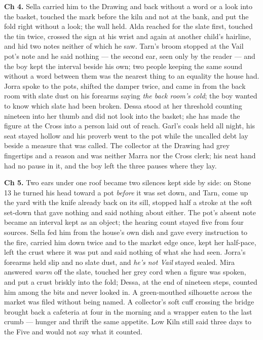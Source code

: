 \documentclass{design/chronicle}
\begin{document}
{\textbf{Ch 4.} Sella carried him to the Drawing and back without a word or a look into the basket, touched the mark before the kiln and not at the bank, and put the fold right without a look; the wall held. Alda reached for the slate first, touched the tin twice, crossed the sign at his wrist and again at another child’s hairline, and hid two notes neither of which he saw. Tarn’s broom stopped at the Vail pot’s note and he said nothing --- the second ear, seen only by the reader --- and the boy kept the interval beside his own; two people keeping the same sound without a word between them was the nearest thing to an equality the house had. Jorra spoke to the pots, shifted the damper twice, and came in from the back room with slate dust on his forearms saying \emph{the back room’s cold}; the boy wanted to know which slate had been broken. Dessa stood at her threshold counting nineteen into her thumb and did not look into the basket; she has made the figure at the Cross into a person laid out of reach. Garl’s coals held all night, his seat stayed hollow and his proverb went to the pot while the uncalled debt lay beside a measure that was called. The collector at the Drawing had grey fingertips and a reason and was neither Marra nor the Cross clerk; his neat hand had no pause in it, and the boy left the three pauses where they lay.

\textbf{Ch 5.} Two ears under one roof became two silences kept side by side: on Stone 13 he turned his head toward a pot \emph{before} it was set down, and Tarn, come up the yard with the knife already back on its sill, stopped half a stroke at the soft set-down that gave nothing and said nothing about either. The pot’s absent note became an interval kept as an object; the hearing count stayed five from four sources. Sella fed him from the house’s own dish and gave every instruction to the fire, carried him down twice and to the market edge once, kept her half-pace, left the crust where it was put and said nothing of what she had seen. Jorra’s forearms held slip and no slate dust, and \emph{he’s not Vail} stayed sealed. Mira answered \emph{warm} off the slate, touched her grey cord when a figure was spoken, and put a crust briskly into the fold; Dessa, at the end of nineteen steps, counted him among the bits and never looked in. A green-mouthed silhouette across the market was filed without being named. A collector’s soft cuff crossing the bridge brought back a cafeteria at four in the morning and a wrapper eaten to the last crumb --- hunger and thrift the same appetite. Low Kiln still said three days to the Five and would not say what it counted.

}
\end{document}
